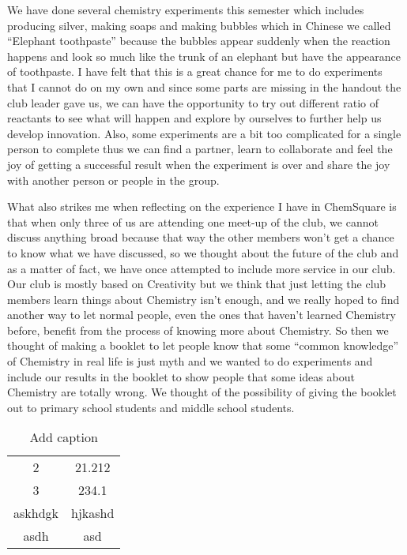 \documentclass[11pt,a4paper,titlepage]{article}
\begin{document}
We have done several chemistry experiments this semester which includes producing silver, making soaps and making bubbles which in Chinese we called “Elephant toothpaste” because the bubbles appear suddenly when the reaction happens and look so much like the trunk of an elephant but have the appearance of toothpaste. I have felt that this is a great chance for me to do experiments that I cannot do on my own and since some parts are missing in the handout the club leader gave us, we can have the opportunity to try out different ratio of reactants to see what will happen and explore by ourselves to further help us develop innovation. Also, some experiments are a bit too complicated for a single person to complete thus we can find a partner, learn to collaborate and feel the joy of getting a successful result when the experiment is over and share the joy with another person or people in the group.

What also strikes me when reflecting on the experience I have in ChemSquare is that when only three of us are attending one meet-up of the club, we cannot discuss anything broad because that way the other members won’t get a chance to know what we have discussed, so we thought about the future of the club and as a matter of fact, we have
once attempted to include more service in our club. Our club is mostly based on Creativity but we think that just letting the club members learn things about Chemistry isn’t enough, and we really hoped to find another way to let normal people, even the ones that haven’t learned Chemistry before, benefit from the process of knowing more about Chemistry. So then we thought of making a booklet to let people know that some “common knowledge” of Chemistry in real life is just myth and we wanted to do experiments and include our results in the booklet to show people that some ideas about Chemistry are totally wrong. We thought of the possibility of giving the booklet out to primary school students and middle school students.

\begin{table}[S]
  \centering
  \caption{Add caption}
    \begin{tabular}{cc}
    \toprule
    2     & 21.212 \\
    3     & 234.1 \\
    \midrule
    askhdgk & hjkashd \\
    asdh  & asd \\
    \bottomrule
    \end{tabular}%
  \label{tab:addlabel}%
\end{table}
\end{document}
